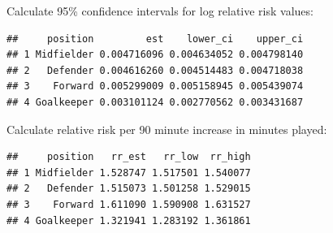 \documentclass[]{book}
\makeatletter
\newenvironment{Shaded}{\begin{snugshade}}{\end{snugshade}}
\newcommand{\KeywordTok}[1]{\textcolor[rgb]{0.13,0.29,0.53}{\textbf{#1}}}
\newcommand{\DataTypeTok}[1]{\textcolor[rgb]{0.13,0.29,0.53}{#1}}
\newcommand{\DecValTok}[1]{\textcolor[rgb]{0.00,0.00,0.81}{#1}}
\newcommand{\FloatTok}[1]{\textcolor[rgb]{0.00,0.00,0.81}{#1}}
\newcommand{\StringTok}[1]{\textcolor[rgb]{0.31,0.60,0.02}{#1}}
\newcommand{\OperatorTok}[1]{\textcolor[rgb]{0.81,0.36,0.00}{\textbf{#1}}}
\newcommand{\NormalTok}[1]{#1}
\newenvironment{kframe}{%
\medskip{}
\setlength{\fboxsep}{.8em}
 \def\at@end@of@kframe{}%
 \ifinner\ifhmode%
  \def\at@end@of@kframe{\end{minipage}}%
  \begin{minipage}{\columnwidth}%
 \fi\fi%
 \def\FrameCommand##1{\hskip\@totalleftmargin \hskip-\fboxsep
 \colorbox{shadecolor}{##1}\hskip-\fboxsep
     \hskip-\linewidth \hskip-\@totalleftmargin \hskip\columnwidth}%
 \MakeFramed {\advance\hsize-\width
   \@totalleftmargin\z@ \linewidth\hsize
   \@setminipage}}%
 {\par\unskip\endMakeFramed%
 \at@end@of@kframe}
\renewenvironment{Shaded}{\begin{kframe}}{\end{kframe}}
\theoremstyle{definition}
\theoremstyle{definition}
\theoremstyle{definition}
\theoremstyle{remark}
\makeatother
\begin{document}
Calculate 95\% confidence intervals for log relative risk values:

\begin{Shaded}
\end{Shaded}

\begin{verbatim}
##     position         est    lower_ci    upper_ci
## 1 Midfielder 0.004716096 0.004634052 0.004798140
## 2   Defender 0.004616260 0.004514483 0.004718038
## 3    Forward 0.005299009 0.005158945 0.005439074
## 4 Goalkeeper 0.003101124 0.002770562 0.003431687
\end{verbatim}

Calculate relative risk per 90 minute increase in minutes played:

\begin{Shaded}
\end{Shaded}

\begin{verbatim}
##     position   rr_est   rr_low  rr_high
## 1 Midfielder 1.528747 1.517501 1.540077
## 2   Defender 1.515073 1.501258 1.529015
## 3    Forward 1.611090 1.590908 1.631527
## 4 Goalkeeper 1.321941 1.283192 1.361861
\end{verbatim}
\end{document}
